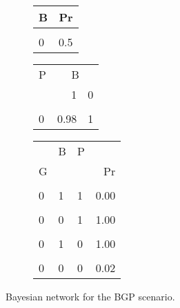 \documentclass[10pt,]{scrartcl}
\begin{document}
\begin{figure}
\hspace{2cm} \hfill
\hspace{-3cm}\begin{subfigure}[!ht]{0.7\textwidth}
\begin{table}[H]
\centering
\begin{tabular}{lr}
\toprule
B & Pr\\
\midrule
\cellcolor{gray!6}{1} & \cellcolor{gray!6}{0.5}\\
0 & 0.5\\
\bottomrule
\end{tabular}
\end{table}

\begin{table}[H]
\centering
\begin{tabular}{lrr}
\toprule
\multicolumn{1}{c}{P} & \multicolumn{2}{c}{B} \\
  & 1 & 0\\
\midrule
\cellcolor{gray!6}{1} & \cellcolor{gray!6}{0.02} & \cellcolor{gray!6}{0}\\
0 & 0.98 & 1\\
\bottomrule
\end{tabular}
\end{table}

\begin{table}[H]
\centering
\begin{tabular}{lllr}
\toprule
\multicolumn{1}{c}{} & \multicolumn{1}{c}{B} & \multicolumn{1}{c}{P} & \multicolumn{1}{c}{} \\
G &  &  & Pr\\
\midrule
\cellcolor{gray!6}{1} & \cellcolor{gray!6}{1} & \cellcolor{gray!6}{1} & \cellcolor{gray!6}{1.00}\\
0 & 1 & 1 & 0.00\\
\cellcolor{gray!6}{1} & \cellcolor{gray!6}{0} & \cellcolor{gray!6}{1} & \cellcolor{gray!6}{0.00}\\
0 & 0 & 1 & 1.00\\
\cellcolor{gray!6}{1} & \cellcolor{gray!6}{1} & \cellcolor{gray!6}{0} & \cellcolor{gray!6}{0.00}\\
0 & 1 & 0 & 1.00\\
\cellcolor{gray!6}{1} & \cellcolor{gray!6}{0} & \cellcolor{gray!6}{0} & \cellcolor{gray!6}{0.98}\\
0 & 0 & 0 & 0.02\\
\bottomrule
\end{tabular}
\end{table}
\end{subfigure}
\caption{Bayesian network for the \textsf{BGP} scenario.}
\label{fig:BGP}
\end{figure}
\end{document}
